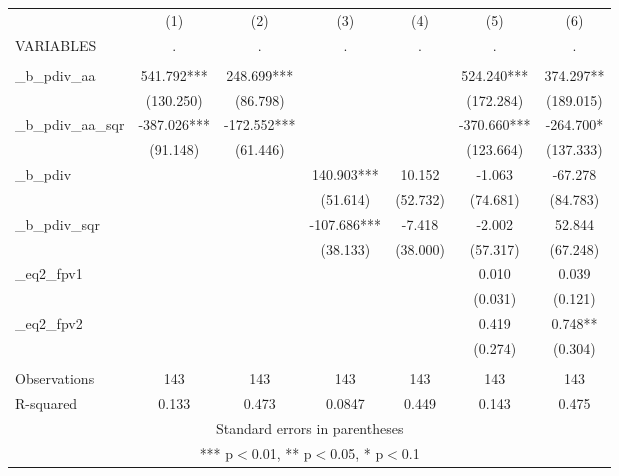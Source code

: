 \documentclass[]{article}
\begin{document}
\begin{tabular}{lcccccc} \hline
 & (1) & (2) & (3) & (4) & (5) & (6) \\
VARIABLES & . & . & . & . & . & . \\ \hline
 &  &  &  &  &  &  \\
\_b\_pdiv\_aa & 541.792*** & 248.699*** &  &  & 524.240*** & 374.297** \\
 & (130.250) & (86.798) &  &  & (172.284) & (189.015) \\
\_b\_pdiv\_aa\_sqr & -387.026*** & -172.552*** &  &  & -370.660*** & -264.700* \\
 & (91.148) & (61.446) &  &  & (123.664) & (137.333) \\
\_b\_pdiv &  &  & 140.903*** & 10.152 & -1.063 & -67.278 \\
 &  &  & (51.614) & (52.732) & (74.681) & (84.783) \\
\_b\_pdiv\_sqr &  &  & -107.686*** & -7.418 & -2.002 & 52.844 \\
 &  &  & (38.133) & (38.000) & (57.317) & (67.248) \\
\_eq2\_fpv1 &  &  &  &  & 0.010 & 0.039 \\
 &  &  &  &  & (0.031) & (0.121) \\
\_eq2\_fpv2 &  &  &  &  & 0.419 & 0.748** \\
 &  &  &  &  & (0.274) & (0.304) \\
 &  &  &  &  &  &  \\
Observations & 143 & 143 & 143 & 143 & 143 & 143 \\
 R-squared & 0.133 & 0.473 & 0.0847 & 0.449 & 0.143 & 0.475 \\ \hline
\multicolumn{7}{c}{ Standard errors in parentheses} \\
\multicolumn{7}{c}{ *** p$<$0.01, ** p$<$0.05, * p$<$0.1} \\
\end{tabular}
\end{document}
